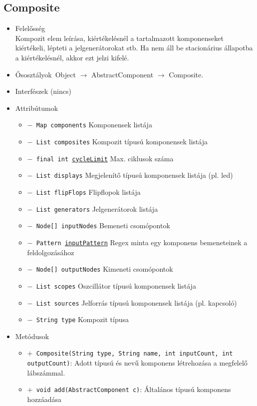 \subsection{Composite}
\begin{itemize}
\item Felelősség\\
Kompozit elem leírása, kiértékelésnél a tartalmazott komponenseket kiértékeli, lépteti  a jelgenerátorokat stb. Ha nem áll be stacionárius állapotba a kiértékelésnél, akkor ezt jelzi kifelé.
\item Ősosztályok\ Object $\rightarrow{}$ AbstractComponent $\rightarrow{}$ Composite.
\item Interfészek (nincs)
\item Attribútumok $\ $
\begin{itemize}
	\item[] \texttt{$-$ Map components} Komponensek listája
	\item[] \texttt{$-$ List composites} Kompozit típusú komponensek listája
	\item[] \texttt{$-$ final int \underline{cycleLimit}} Max. ciklusok száma
	\item[] \texttt{$-$ List displays} Megjelenítő típusú komponensek listája (pl. led)
	\item[] \texttt{$-$ List flipFlops} Flipflopok listája
	\item[] \texttt{$-$ List generators} Jelgenerátorok listája
	\item[] \texttt{$-$ Node[] inputNodes} Bemeneti csomópontok
	\item[] \texttt{$-$ Pattern \underline{inputPattern}} Regex minta egy komponens bemeneteinek a feldolgozásához
	\item[] \texttt{$-$ Node[] outputNodes} Kimeneti csomópontok
	\item[] \texttt{$-$ List scopes} Oszcillátor típusú komponensek listája
	\item[] \texttt{$-$ List sources} Jelforrás típusú komponensek listája (pl. kapcsoló)
	\item[] \texttt{$-$ String type} Kompozit típusa
\end{itemize}
\item Metódusok$\ $
\begin{itemize}
	\item[] \texttt{$+$ Composite(String type, String name, int inputCount, int outputCount)}: Adott típusú és nevű komponens létrehozása a megfelelő lábszámmal.
	\item[] \texttt{$+$ void add(AbstractComponent c)}: Általános típusú komponens hozzáadása

\end{itemize}
\end{itemize}
